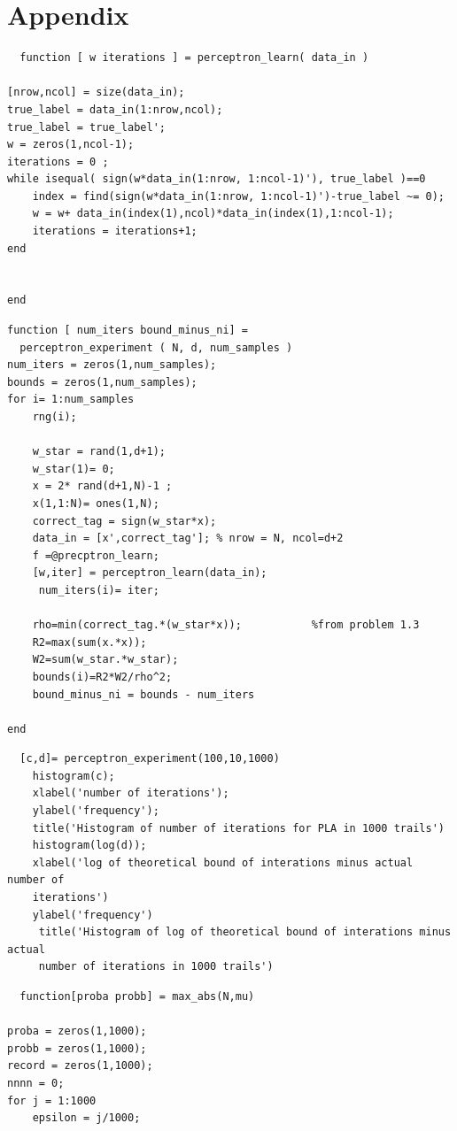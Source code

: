\documentclass[12pt]{article}
\begin{document}
\section{Appendix
}
\begin{appendices}
 \begin{lstlisting}
  function [ w iterations ] = perceptron_learn( data_in )

[nrow,ncol] = size(data_in);
true_label = data_in(1:nrow,ncol);
true_label = true_label';
w = zeros(1,ncol-1);
iterations = 0 ;
while isequal( sign(w*data_in(1:nrow, 1:ncol-1)'), true_label )==0
    index = find(sign(w*data_in(1:nrow, 1:ncol-1)')-true_label ~= 0);
    w = w+ data_in(index(1),ncol)*data_in(index(1),1:ncol-1);
    iterations = iterations+1;
end


end
  \end{lstlisting}

  \begin{lstlisting}
function [ num_iters bound_minus_ni] =
  perceptron_experiment ( N, d, num_samples )
num_iters = zeros(1,num_samples);
bounds = zeros(1,num_samples);
for i= 1:num_samples
    rng(i);

    w_star = rand(1,d+1);
    w_star(1)= 0;
    x = 2* rand(d+1,N)-1 ;
    x(1,1:N)= ones(1,N);
    correct_tag = sign(w_star*x);
    data_in = [x',correct_tag']; % nrow = N, ncol=d+2
    f =@precptron_learn;
    [w,iter] = perceptron_learn(data_in);
     num_iters(i)= iter;

    rho=min(correct_tag.*(w_star*x));           %from problem 1.3
    R2=max(sum(x.*x));
    W2=sum(w_star.*w_star);
    bounds(i)=R2*W2/rho^2;
    bound_minus_ni = bounds - num_iters

end
  \end{lstlisting}

  \begin{lstlisting}
  [c,d]= perceptron_experiment(100,10,1000)
    histogram(c);
    xlabel('number of iterations');
    ylabel('frequency');
    title('Histogram of number of iterations for PLA in 1000 trails')
    histogram(log(d));
    xlabel('log of theoretical bound of interations minus actual number of 
    iterations')
    ylabel('frequency')
     title('Histogram of log of theoretical bound of interations minus actual 
     number of iterations in 1000 trails')

  \end{lstlisting}
  \begin{lstlisting}
  function[proba probb] = max_abs(N,mu)

proba = zeros(1,1000);
probb = zeros(1,1000);
record = zeros(1,1000);
nnnn = 0;
for j = 1:1000
    epsilon = j/1000;


\end{lstlisting}
\end{appendices}
\end{document}

